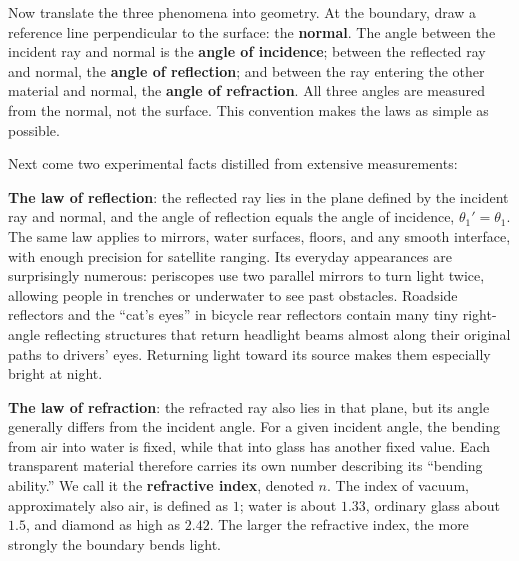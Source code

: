 Now translate the three phenomena into geometry. At the boundary, draw a reference line perpendicular to the surface: the \textbf{normal}. The angle between the incident ray and normal is the \textbf{angle of incidence}; between the reflected ray and normal, the \textbf{angle of reflection}; and between the ray entering the other material and normal, the \textbf{angle of refraction}. All three angles are measured from the normal, not the surface. This convention makes the laws as simple as possible.

\begin{center}
\end{center}

Next come two experimental facts distilled from extensive measurements:

\textbf{The law of reflection}: the reflected ray lies in the plane defined by the incident ray and normal, and the angle of reflection equals the angle of incidence, \(\theta_1'=\theta_1\). The same law applies to mirrors, water surfaces, floors, and any smooth interface, with enough precision for satellite ranging. Its everyday appearances are surprisingly numerous: periscopes use two parallel mirrors to turn light twice, allowing people in trenches or underwater to see past obstacles. Roadside reflectors and the ``cat's eyes'' in bicycle rear reflectors contain many tiny right-angle reflecting structures that return headlight beams almost along their original paths to drivers' eyes. Returning light toward its source makes them especially bright at night.

\textbf{The law of refraction}: the refracted ray also lies in that plane, but its angle generally differs from the incident angle. For a given incident angle, the bending from air into water is fixed, while that into glass has another fixed value. Each transparent material therefore carries its own number describing its ``bending ability.'' We call it the \textbf{refractive index}, denoted \(n\). The index of vacuum, approximately also air, is defined as \(1\); water is about \(1.33\), ordinary glass about \(1.5\), and diamond as high as \(2.42\). The larger the refractive index, the more strongly the boundary bends light.

